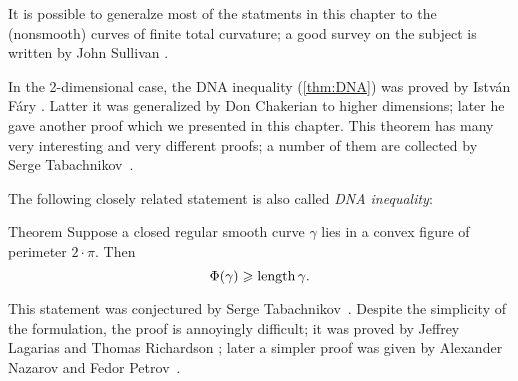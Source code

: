 It is possible to generalze most of the statments in this chapter to the (nonsmooth) curves of finite total curvature;
a good survey on the subject is written by John Sullivan \cite{sullivan-curves}.

In the 2-dimensional case,
the DNA inequality (\ref{thm:DNA}) was proved by Istv\'{a}n F\'{a}ry \cite{fary1950}.
Latter it was generalized by Don Chakerian \cite{chakerian1962} to higher dimensions; later he gave another proof \cite{chakerian1964} which we presented in this chapter.
This theorem has many very interesting and very different proofs;
a number of them are collected by Serge Tabachnikov~\cite{tabachnikov}.

The following closely related statement is also called \emph{DNA inequality}:

\begin{thm}{Theorem}
Suppose a closed regular smooth curve $\gamma$ lies in a convex figure of perimeter $2\cdot \pi$.
Then 
\[\Phi({\gamma})\geqslant \mathop{\rm length}\nolimits\gamma.\]

\end{thm}

This statement was conjectured by Serge Tabachnikov~\cite{tabachnikov}.
Despite the simplicity of the formulation, the proof is annoyingly difficult;
it was proved by Jeffrey Lagarias and Thomas Richardson \cite{lagarias-richardso}; later a simpler proof was given by Alexander Nazarov and Fedor Petrov~\cite{nazarov-petrov}.

